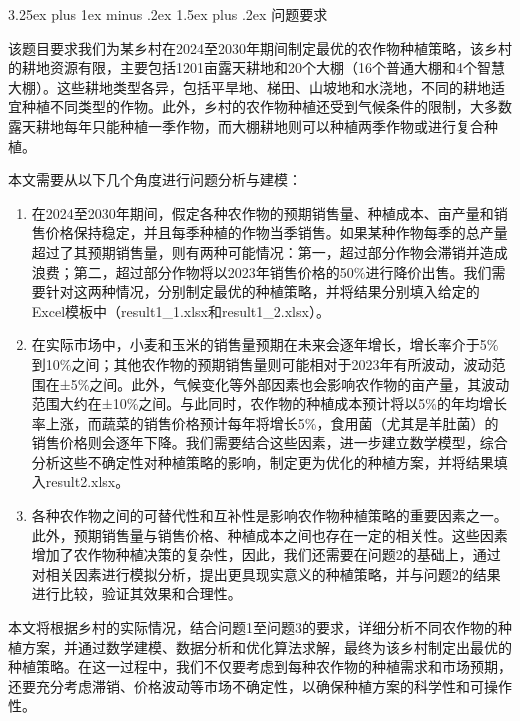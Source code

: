 \documentclass[12pt,a4paper]{nmmcm}
\makeatletter
\renewcommand\subsection{\@startsection{subsection}{2}{0pt}%
    {3.25ex plus 1ex minus .2ex}%
    {1.5ex plus .2ex}%
    {\normalfont\Large\bfseries}}
\makeatother
\begin{document}
\subsection{问题要求}

该题目要求我们为某乡村在2024至2030年期间制定最优的农作物种植策略，该乡村的耕地资源有限，主要包括1201亩露天耕地和20个大棚（16个普通大棚和4个智慧大棚）。这些耕地类型各异，包括平旱地、梯田、山坡地和水浇地，不同的耕地适宜种植不同类型的作物。此外，乡村的农作物种植还受到气候条件的限制，大多数露天耕地每年只能种植一季作物，而大棚耕地则可以种植两季作物或进行复合种植。

本文需要从以下几个角度进行问题分析与建模：
\begin{enumerate}
  \item 在2024至2030年期间，假定各种农作物的预期销售量、种植成本、亩产量和销售价格保持稳定，并且每季种植的作物当季销售。如果某种作物每季的总产量超过了其预期销售量，则有两种可能情况：第一，超过部分作物会滞销并造成浪费；第二，超过部分作物将以2023年销售价格的50\%进行降价出售。我们需要针对这两种情况，分别制定最优的种植策略，并将结果分别填入给定的Excel模板中（result1\_1.xlsx和result1\_2.xlsx）。

  \item 在实际市场中，小麦和玉米的销售量预期在未来会逐年增长，增长率介于5\%到10\%之间；其他农作物的预期销售量则可能相对于2023年有所波动，波动范围在±5\%之间。此外，气候变化等外部因素也会影响农作物的亩产量，其波动范围大约在±10\%之间。与此同时，农作物的种植成本预计将以5\%的年均增长率上涨，而蔬菜的销售价格预计每年将增长5\%，食用菌（尤其是羊肚菌）的销售价格则会逐年下降。我们需要结合这些因素，进一步建立数学模型，综合分析这些不确定性对种植策略的影响，制定更为优化的种植方案，并将结果填入result2.xlsx。

  \item 各种农作物之间的可替代性和互补性是影响农作物种植策略的重要因素之一。此外，预期销售量与销售价格、种植成本之间也存在一定的相关性。这些因素增加了农作物种植决策的复杂性，因此，我们还需要在问题2的基础上，通过对相关因素进行模拟分析，提出更具现实意义的种植策略，并与问题2的结果进行比较，验证其效果和合理性。
\end{enumerate}

本文将根据乡村的实际情况，结合问题1至问题3的要求，详细分析不同农作物的种植方案，并通过数学建模、数据分析和优化算法求解，最终为该乡村制定出最优的种植策略。在这一过程中，我们不仅要考虑到每种农作物的种植需求和市场预期，还要充分考虑滞销、价格波动等市场不确定性，以确保种植方案的科学性和可操作性。
\end{document}
